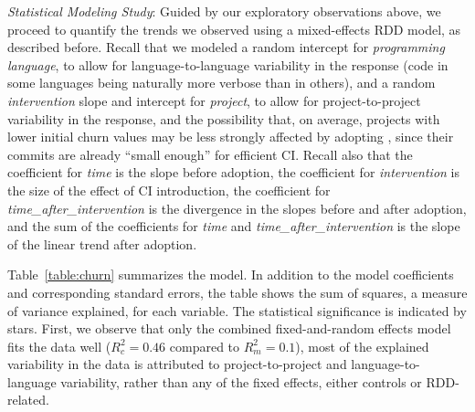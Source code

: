 

%


\smallskip\noindent \emph{Statistical Modeling Study}: 
Guided by our exploratory observations above, we proceed to quantify the 
trends we observed using a mixed-effects RDD model, as described before.
Recall that we modeled a random intercept for \emph{programming language}, 
to allow for language-to-language variability in the response (\ie code in some 
languages being naturally more verbose than in others), and a random 
\emph{intervention} slope and intercept for \emph{project}, to allow for 
project-to-project variability in the response, and the possibility that, on average, 
projects with lower initial churn values may be less strongly affected by adopting 
\Tvis, since their commits are already ``small enough'' for efficient CI.
Recall also that the coefficient for \emph{time} is the slope before adoption,
the coefficient for \emph{intervention} is the size of the effect of CI introduction,
the coefficient for \emph{time\_after\_intervention} is the divergence in the slopes
before and after \Tvis adoption, and the sum of the coefficients for \emph{time}
and \emph{time\_after\_intervention} is the slope of the linear trend after \Tvis
adoption.

Table~\ref{table:churn} summarizes the model.
In addition to the model coefficients and corresponding standard errors, the table 
shows the sum of squares, a measure of variance explained, for each variable.
The statistical significance is indicated by stars.
First, we observe that only the combined fixed-and-random effects model fits the 
data well ($R_c^2 = 0.46$ compared to $R_m^2 = 0.1$), \ie most of the explained 
variability in the data is attributed to project-to-project and language-to-language
variability, rather than any of the fixed effects, either controls or RDD-related.

